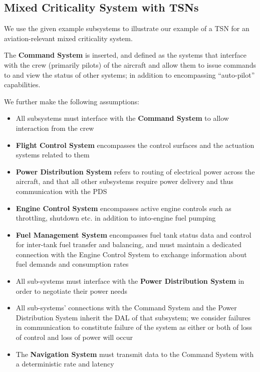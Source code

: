 
\subsection{Mixed Criticality System with TSNs}

We use the given example subsystems to illustrate our example of a TSN for an aviation-relevant mixed criticality system.

The \textbf{Command System} is inserted, and defined as the systems that interface with the crew (primarily pilots) of the aircraft and allow them to issue commands to and view the status of other systems; in addition to encompassing ``auto-pilot'' capabilities.

We further make the following assumptions:

\begin{itemize}
    \item All subsystems must interface with the \textbf{Command System} to allow interaction from the crew
    \item \textbf{Flight Control System} encompasses the control surfaces and the actuation systems related to them
    \item \textbf{Power Distribution System} refers to routing of electrical power across the aircraft, and that all other subsystems require power delivery and thus communication with the PDS
    \item \textbf{Engine Control System} encompasses active engine controls such as throttling, shutdown etc. in addition to into-engine fuel pumping
    \item \textbf{Fuel Management System} encompasses fuel tank status data and control for inter-tank fuel transfer and balancing, and must maintain a dedicated connection with the Engine Control System to exchange information about fuel demands and consumption rates
    \item All sub-systems must interface with the \textbf{Power Distribution System} in order to negotiate their power needs
    \item All sub-systems' connections with the Command System and the Power Distribution System inherit the DAL of that subsystem; we consider failures in communication to constitute failure of the system as either or both of loss of control and loss of power will occur
    \item The \textbf{Navigation System} must transmit data to the Command System with a deterministic rate and latency
\end{itemize}

